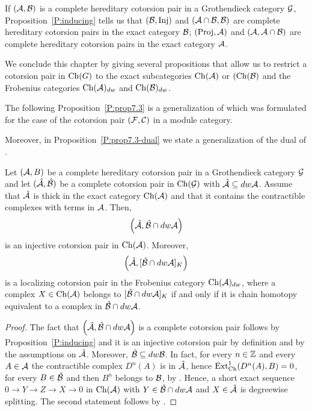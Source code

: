 %
%
%

\begin{rem}\label{R:induced} If $(\mathcal{A}, \mathcal{B})$ is a complete hereditary cotorsion pair in a Grothendieck category $\mathcal{G}$, Proposition~\ref{P:inducing} tells us that $(\mathcal{B}, \mathrm{Inj})$ and $(\mathcal{A}\cap \mathcal{B}, \mathcal{B})$  are complete hereditary cotorsion pairs in the exact category $\mathcal{B}$; $(\mathrm{Proj}, \mathcal{A})$ and $(\mathcal{A}, \mathcal{A}\cap \mathcal{B})$ are complete hereditary cotorsion pairs  in the exact category $\mathcal{A}$.
\end{rem}


%

We conclude this chapter by giving several propositions that allow us to restrict a cotorsion pair in $\mathrm{Ch}(G)$ to the exact subcategories $\mathrm{Ch}(\mathcal{A})$ or $(\mathrm{Ch}(\mathcal{B})$ and the Frobenius categories $\mathrm{Ch}(\mathcal{A})_{dw}$ and $\mathrm{Ch}(\mathcal{B})_{dw}$.

 The following Proposition~\ref{P:prop7.3} is a generalization of \cite[Proposition 7.3]{G7} which was formulated for the case of the cotorsion pair $(\mathcal{F}, \mathcal{C})$ in a module category. %

Moreover, in Proposition~\ref{P:prop7.3-dual} we state a generalization of the dual of \cite[Proposition 7.3]{G7}.
%


\begin{prop}\label{P:prop7.3} Let $(\mathcal{A}, B)$ be a complete hereditary cotorsion pair in a Grothendieck category $\mathcal{G}$ and let $(\hat{\mathcal{A}}, \hat{\mathcal{B}})$ be a complete cotorsion pair in $\mathrm{Ch}(\mathcal{G})$ with $\hat{\mathcal{A}}\subseteq dw\mathcal{A}$. Assume that $\hat{\mathcal{A}}$ is thick in the exact category $\mathrm{Ch}(\mathcal{A})$ and that it contains the contractible complexes with terms in $\mathcal{A}$.
Then, \[\Big(\hat{\mathcal{A}}, \hat{\mathcal{B}}\cap dw \mathcal{A}\Big)\] is an injective cotorsion pair in $\mathrm{Ch}(\mathcal{A})$.
Moreover,  \[\Big(\hat{\mathcal{A}}, [\hat{\mathcal{B}}\cap dw \mathcal{A}]_K\Big)\] is a localizing cotorsion pair in the Frobenius category $\mathrm{Ch}(\mathcal{A})_{dw}$, where a complex $X\in \mathrm{Ch}(\mathcal{A})$ belongs to $[\hat{\mathcal{B}}\cap dw \mathcal{A}]_K$ if and only if it is chain homotopy equivalent to a complex in $\hat{\mathcal{B}}\cap dw \mathcal{A}$.
\end{prop}
%
\begin{proof} The fact that $\Big(\hat{\mathcal{A}}, \hat{\mathcal{B}}\cap dw \mathcal{A}\Big)$ is a complete cotorsion pair follows by Proposition~\ref{P:inducing} and it is an injective cotorsion pair by definition and by the assumptions on $\hat{\mathcal{A}}$. Moreover, $\hat{\mathcal{B}}\subseteq dw \mathcal{B}$. In fact, for every $n\in \mathbb{Z}$ and every  $A\in \mathcal{A}$  the contractible complex $D^n(A)$ is in $\hat{\mathcal{A}}$, hence $\operatorname{Ext}^1_{\mathrm{Ch}}(D^n(A),  B)=0$, for every $B\in\hat{\mathcal{B}}$ and then $B^n$ belongs to $\mathcal{B}$, by \cite[Lemma 3.1]{G1}. Hence, a short exact sequence $0\to Y\to Z\to X\to 0$ in $\mathrm{Ch}(\mathcal{A})$ with $Y\in\hat{\mathcal{B}}\cap dw \mathcal{A}$ and $X\in \hat{\mathcal{A}}$ is degreewise splitting. The second statement follows by \cite[Theorem 6.3, Proposition 6.4]{G7}.
\end{proof}
%

